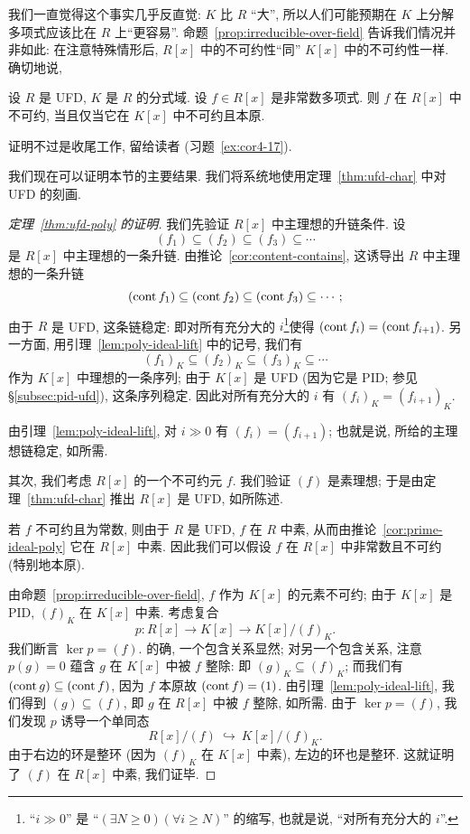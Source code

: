 \noindent 我们一直觉得这个事实几乎反直觉: $K$ 比 $R$ ``大'', 所以人们可能预期在 $K$ 上分解多项式应该比在 $R$ 上``更容易''. 命题~\ref{prop:irreducible-over-field} 告诉我们情况并非如此: 在注意特殊情形后, $R[x]$ 中的不可约性``同'' $K[x]$ 中的不可约性一样. 确切地说,

\begin{corollary}\label{cor:irreducible-poly-equiv}
设 $R$ 是 UFD, $K$ 是 $R$ 的分式域. 设 $f\in R[x]$ 是非常数多项式. 则 $f$ 在 $R[x]$ 中不可约, 当且仅当它在 $K[x]$ 中不可约且本原.
\end{corollary}

\noindent 证明不过是收尾工作, 留给读者 (习题~\ref{ex:cor4-17}).

\noindent 我们现在可以证明本节的主要结果. 我们将系统地使用定理~\ref{thm:ufd-char} 中对 UFD 的刻画.

\begin{proof}[定理~\ref{thm:ufd-poly} 的证明]
我们先验证 $R[x]$ 中主理想的升链条件. 设
\[
(f_1)\subseteq (f_2)\subseteq (f_3)\subseteq \cdots
\]
是 $R[x]$ 中主理想的一条升链. 由推论~\ref{cor:content-contains}, 这诱导出 $R$ 中主理想的一条升链
\[
(\operatorname{cont} f_1)\subseteq (\operatorname{cont} f_2)\subseteq (\operatorname{cont} f_3)\subseteq \cdots;
\]
由于 $R$ 是 UFD, 这条链稳定: 即对所有充分大的 $i$\footnote{``$i\gg 0$'' 是 ``$(\exists N\ge 0)(\forall i\ge N)$'' 的缩写, 也就是说, ``对所有充分大的 $i$''.}使得 $(\operatorname{cont} f_i)=(\operatorname{cont} f_{i+1})$. 另一方面, 用引理~\ref{lem:poly-ideal-lift} 中的记号, 我们有
\[
(f_1)_K\subseteq (f_2)_K\subseteq (f_3)_K\subseteq \cdots
\]
作为 $K[x]$ 中理想的一条序列; 由于 $K[x]$ 是 UFD (因为它是 PID; 参见 §\ref{subsec:pid-ufd}), 这条序列稳定. 因此对所有充分大的 $i$ 有 $(f_i)_K=(f_{i+1})_K$.

\noindent 由引理~\ref{lem:poly-ideal-lift}, 对 $i\gg 0$ 有 $(f_i)=(f_{i+1})$; 也就是说, 所给的主理想链稳定, 如所需.

\noindent 其次, 我们考虑 $R[x]$ 的一个不可约元 $f$. 我们验证 $(f)$ 是素理想; 于是由定理~\ref{thm:ufd-char} 推出 $R[x]$ 是 UFD, 如所陈述.

\noindent 若 $f$ 不可约且为常数, 则由于 $R$ 是 UFD, $f$ 在 $R$ 中素, 从而由推论~\ref{cor:prime-ideal-poly} 它在 $R[x]$ 中素. 因此我们可以假设 $f$ 在 $R[x]$ 中非常数且不可约 (特别地本原).

\noindent 由命题~\ref{prop:irreducible-over-field}, $f$ 作为 $K[x]$ 的元素不可约; 由于 $K[x]$ 是 PID, $(f)_K$ 在 $K[x]$ 中素. 考虑复合
\[
p: R[x]\longrightarrow K[x]\longrightarrow K[x]/(f)_K.
\]
我们断言 $\ker p = (f)$. 的确, 一个包含关系显然; 对另一个包含关系, 注意 $p(g)=0$ 蕴含 $g$ 在 $K[x]$ 中被 $f$ 整除: 即 $(g)_K\subseteq (f)_K$; 而我们有 $(\operatorname{cont} g)\subseteq (\operatorname{cont} f)$, 因为 $f$ 本原故 $(\operatorname{cont} f)=(1)$. 由引理~\ref{lem:poly-ideal-lift}, 我们得到 $(g)\subseteq (f)$, 即 $g$ 在 $R[x]$ 中被 $f$ 整除, 如所需. 由于 $\ker p=(f)$, 我们发现 $p$ 诱导一个单同态
\[
R[x]/(f)\ \hookrightarrow\ K[x]/(f)_K.
\]
由于右边的环是整环 (因为 $(f)_K$ 在 $K[x]$ 中素), 左边的环也是整环. 这就证明了 $(f)$ 在 $R[x]$ 中素, 我们证毕.
\end{proof}

